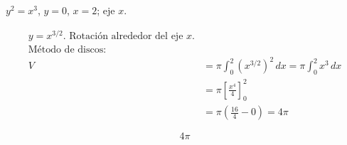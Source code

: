$y^2=x^3$, $y=0$, $x=2$; eje $x$.

\nopagebreak
\begin{align*}
y = x^{3/2}. \text{ Rotación alrededor del eje } x. \\
\text{Método de discos:} \\
V &= \pi \int_{0}^{2} (x^{3/2})^2 \, dx = \pi \int_{0}^{2} x^3 \, dx \\
&= \pi \left[ \frac{x^4}{4} \right]_{0}^{2} \\
&= \pi \left( \frac{16}{4} - 0 \right) = 4\pi
\end{align*}

\[
\boxed{\displaystyle 4\pi}
\]
